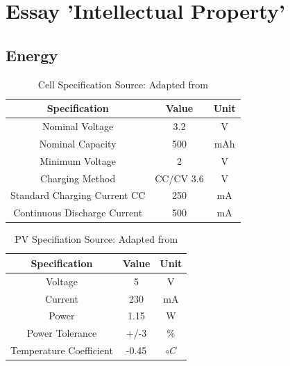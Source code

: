 \documentclass[10pt,twoside]{article}
\begin{document}
\section{Essay 'Intellectual Property'}




\newpage
\begin{appendices}

\section{Energy}

\setcounter{figure}{0}  %
\setcounter{table}{0}   %



\begin{table}[htb]
    \centering
    \renewcommand{\arraystretch}{1.3}
    \begin{tabular}{||c|c|c||}
    \hline
    Specification & Value & Unit \\ [0.5ex]
    \hline \hline
    Nominal Voltage    & 3.2 & V\\
    Nominal Capacity     & 500 & mAh\\
    Minimum Voltage         & 2  & V\\
    Charging Method     & CC/CV 3.6  & V\\
    Standard Charging Current CC    & 250  & mA\\
    Continuous Discharge Current   & 500  &   mA\\
    \hline
    \end{tabular}
    \caption{Cell Specification \quad Source: Adapted from \cite{AmpsplusBattery}}
    \label{fig:CellSpecification}
\end{table}
\label{appendix:Energy}

\begin{table}[htb]
    \centering
    \renewcommand{\arraystretch}{1.3}
    \begin{tabular}{||c|c|c||}
    \hline
    Specification & Value & Unit \\ [0.5ex]
    \hline \hline
        Voltage  & 5 & V\\
        Current & 230 & mA\\
        Power & 1.15 & W \\
        Power Tolerance & +/-3 & \% \\
        Temperature Coefficient & -0.45 & $\circ C$ \\
        \hline
    \end{tabular}
    \caption{PV Specifiation \quad Source: Adapted from \cite{NoTitle}}
    \label{tab:PVSpecification}
\end{table}

\end{appendices}



\end{document}
